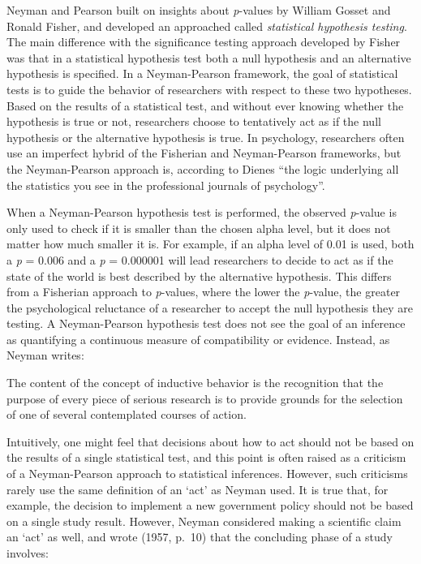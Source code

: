 \documentclass[
  oneside]{krantz}
\renewenvironment{quote}{\begin{VF}}{\end{VF}}
\begin{document}
Neyman and Pearson built on insights about \emph{p}-values by William Gosset and Ronald Fisher, and developed an approached called \emph{statistical hypothesis testing}. The main difference with the significance testing approach developed by Fisher was that in a statistical hypothesis test both a null hypothesis and an alternative hypothesis is specified. In a Neyman-Pearson framework, the goal of statistical tests is to guide the behavior of researchers with respect to these two hypotheses. Based on the results of a statistical test, and without ever knowing whether the hypothesis is true or not, researchers choose to tentatively act as if the null hypothesis or the alternative hypothesis is true. In psychology, researchers often use an imperfect hybrid of the Fisherian and Neyman-Pearson frameworks, but the Neyman-Pearson approach is, according to Dienes \citeyearpar{dienes_understanding_2008} ``the logic underlying all the statistics you see in the professional journals of psychology''.

When a Neyman-Pearson hypothesis test is performed, the observed \emph{p}-value is only used to check if it is smaller than the chosen alpha level, but it does not matter how much smaller it is. For example, if an alpha level of 0.01 is used, both a \emph{p} = 0.006 and a \emph{p} = 0.000001 will lead researchers to decide to act as if the state of the world is best described by the alternative hypothesis. This differs from a Fisherian approach to \emph{p}-values, where the lower the \emph{p}-value, the greater the psychological reluctance of a researcher to accept the null hypothesis they are testing. A Neyman-Pearson hypothesis test does not see the goal of an inference as quantifying a continuous measure of compatibility or evidence. Instead, as Neyman \citeyearpar{neyman_inductive_1957} writes:

\begin{quote}
The content of the concept of inductive behavior is the recognition that the purpose of every piece of serious research is to provide grounds for the selection of one of several contemplated courses of action.
\end{quote}

Intuitively, one might feel that decisions about how to act should not be based on the results of a single statistical test, and this point is often raised as a criticism of a Neyman-Pearson approach to statistical inferences. However, such criticisms rarely use the same definition of an `act' as Neyman used. It is true that, for example, the decision to implement a new government policy should not be based on a single study result. However, Neyman considered making a scientific claim an `act' as well, and wrote (1957, p.~10) that the concluding phase of a study involves:
\end{document}
